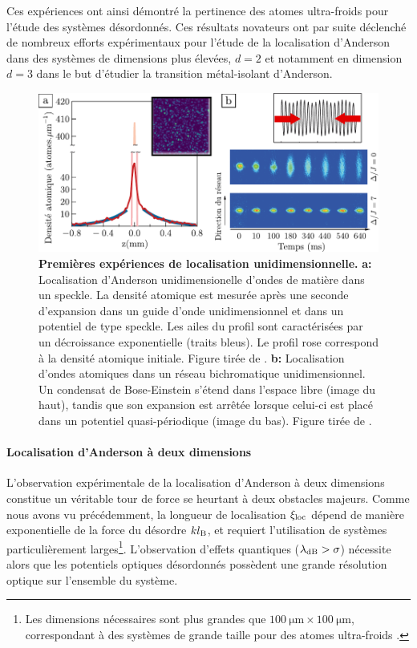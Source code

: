 Ces expériences ont ainsi démontré la pertinence des atomes ultra-froids pour l'étude des systèmes désordonnés. Ces résultats novateurs ont par suite déclenché de nombreux efforts expérimentaux pour l'étude de la localisation d'Anderson dans des systèmes de dimensions plus élevées, $d=2$ et notamment en dimension $d=3$ dans le but d'étudier la transition métal-isolant d'Anderson. 

\begin{figure}
\centering
\includegraphics[width=\textwidth]{Fig/Localisation/localisation_1D_atomes.pdf}
\caption{\textbf{Premières expériences de localisation unidimensionnelle.} \textbf{a:} Localisation d'Anderson unidimensionelle d'ondes de matière dans un speckle. La densité atomique est mesurée après une seconde d'expansion dans un guide d'onde unidimensionnel et dans un potentiel de type speckle. Les ailes du profil sont caractérisées par un décroissance exponentielle (traits bleus). Le profil rose correspond à la densité atomique initiale. Figure tirée de \citep{billy2008direct}. \textbf{b:} Localisation d'ondes atomiques dans un réseau bichromatique unidimensionnel. Un condensat de Bose-Einstein s'étend dans l'espace libre (image du haut), tandis que son expansion est arrêtée lorsque celui-ci est placé dans un potentiel quasi-périodique (image du bas). Figure tirée de \citep{roati2008anderson}. }
\label{fig:localisation_1D_atomes_froids}
\end{figure}

\paragraph*{Localisation d'Anderson à deux dimensions}
L'observation expérimentale de la localisation d'Anderson à deux dimensions constitue un véritable tour de force se heurtant à deux obstacles majeurs. Comme nous avons vu précédemment, la longueur de localisation $\xi_{\mathrm{loc}}$ dépend de manière exponentielle de la force du désordre $kl_{\mathrm{B}}$, et requiert l'utilisation de systèmes particulièrement larges\footnote{Les dimensions nécessaires sont plus grandes que $\SI{100}{\micro\metre}\times\SI{100}{\micro\metre}$, correspondant à des systèmes de grande taille pour des atomes ultra-froids \citep{white2019observation}.}. L'observation d'effets quantiques ($\lambda_{\mathrm{dB}}>\sigma$) nécessite alors que les potentiels optiques désordonnés possèdent une grande résolution optique sur l'ensemble du système.

